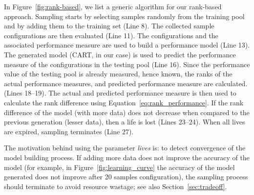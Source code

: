 In Figure~\ref{fig:rank-based}, we list a generic algorithm for our rank-based approach. Sampling starts by selecting samples randomly from the training pool and by adding them to the training set (Line 8). The collected sample configurations are then evaluated (Line 11). The configurations and the associated performance measure are used to build a performance model (Line 13). The generated model (CART, in our case) is used to predict the performance measure of the configurations in the testing pool (Line 16). Since the performance value of the testing pool is already measured, hence known, the ranks of the actual performance measures, and predicted performance measure are calculated. (Lines 18--19). The actual and predicted performance measure is then used to calculate the rank difference using Equation~\ref{eq:rank_performance}. If the rank difference of the model (with more data) does not decrease  when compared to the previous generation (lesser data), then a life is lost (Lines 23--24). When all lives are expired, sampling terminates (Line 27).

The motivation behind using the parameter \textit{lives} is: to detect convergence of the model building process. If adding more data does not improve the accuracy of the model (for example, in Figure~\ref{fig:learning_curve} the accuracy of the model generated does not improve after 20 samples configuration), the sampling process should terminate to avoid resource wastage; see also Section~\ref{sec:tradeoff}.

